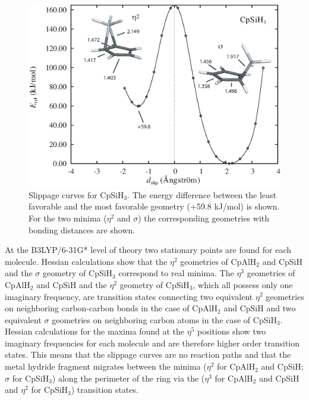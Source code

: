 \begin{figure}[hbtp]
\center
\includegraphics[scale=0.80]{cyclopentadienyl/figures/cpsih3.eps}
\caption{Slippage curves for CpSiH$_3$. The energy difference between the least favorable and the most favorable geometry (+59.8 kJ/mol) is shown. For the two minima ($\eta^2$ and $\sigma$) the corresponding geometries with bonding distances are shown.}
\label{ch4.fig.slip_cpsih3}
\end{figure}
At the B3LYP/6-31G* level of theory two stationary points are found for each molecule. Hessian calculations show that the $\eta^2$ geometries of CpAlH$_2$ and CpSiH and the $\sigma$ geometry of CpSiH$_3$ correspond to real minima. The $\eta^3$ geometries of CpAlH$_2$ and CpSiH and the $\eta^2$ geometry of CpSiH$_3$, which all possess only one imaginary frequency, are transition states connecting two equivalent $\eta^2$ geometries on neighboring carbon-carbon bonds in the case of CpAlH$_2$ and CpSiH and two equivalent $\sigma$ geometries on neighboring carbon atoms in the case of CpSiH$_3$. Hessian calculations for the maxima found at the $\eta^5$ positions show two imaginary frequencies for each molecule and are therefore higher order transition states. This means that the slippage curves are no reaction paths and that the metal hydride fragment migrates between the minima ($\eta^2$ for CpAlH$_2$ and CpSiH; $\sigma$ for CpSiH$_3$) along the perimeter of the ring via the ($\eta^3$ for CpAlH$_2$ and CpSiH and $\eta^2$ for CpSiH$_3$) transition states.


